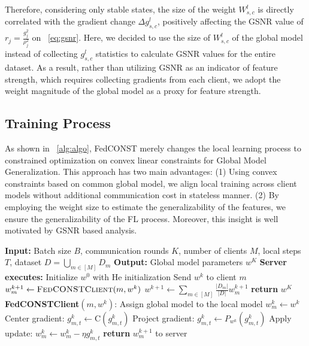 \documentclass{article}
\theoremstyle{plain}
\theoremstyle{definition}
\theoremstyle{remark}
\begin{document}
Therefore, considering only stable states, the size of the weight $W_{s,c}^{l}$ is directly correlated with the gradient change $\Delta g_{s,c}^{l}$, positively affecting the GSNR value of $r_j = \frac{g_j^2}{\rho_j^2}$ on ~\cref{eq:gsnr}. Here, we decided to use the size of $W_{s,c}^{l}$ of the global model instead of collecting $g_{s,c}^{l}$ statistics to calculate GSNR values for the entire dataset. As a result, rather than utilizing GSNR as an indicator of feature strength, which requires collecting gradients from each client, we adopt the weight magnitude of the global model as a proxy for feature strength.


\subsection{Training Process}
As shown in ~\cref{alg:algo}, FedCONST merely changes the local learning process to constrained optimization on convex linear constraints for Global Model Generalization. This approach has two main advantages: (1) Using convex constraints based on common global model, we align local training across client models without additional communication cost in stateless manner. (2) By employing the weight size to estimate the generalizability of the features, we ensure the generalizability of the FL process. Moreover, this insight is well motivated by GSNR based analysis. 


\begin{algorithm}[h]
\caption{Training procedure of FedCONST}
\label{alg:algo}
\begin{algorithmic}[1]
\STATE \textbf{Input:} Batch size $B$, communication rounds $K$, number of clients $M$, local steps $T$, dataset $D = \bigcup_{m\in[M]}D_m$
\STATE \textbf{Output:} Global model parameters $w^K$
\STATE \textbf{Server executes:}
\STATE Initialize $w^0$ with He initialization
        \STATE Send $w^k$ to client $m$
        \STATE $w^{k+1}_m \leftarrow \textsc{FedCONSTClient}(m, w^k)$
    \ENDFOR
    \STATE $w^{k+1} \gets \sum_{m \in [M]} \frac{|D_m|}{|D|} w^{k+1}_m$
\ENDFOR
\STATE \textbf{return} $w^K$
\STATE \textbf{FedCONSTClient}$(m, w^k)$:
\STATE Assign global model to the local model $w_m^k \leftarrow w^k$
        \STATE Center gradient: $g_{m,t}^k \gets \mathrm{C}(g_{m,t}^k)$
        \STATE Project gradient: $g_{m,t}^k \gets P_{w^k}(g_{m,t}^k)$
        \STATE Apply update: $w_m^k \gets w_m^k - \eta g_{m,t}^k$
    \ENDFOR
\ENDFOR
\STATE \textbf{return} $w^{k+1}_m$ to server
\end{algorithmic}
\end{algorithm}
\end{document}
